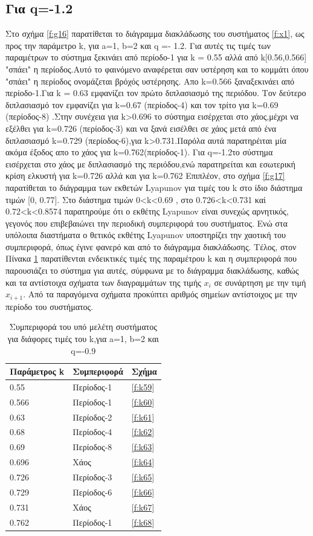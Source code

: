 \subsection{Για q=-1.2}
Στο σχήμα \ref{f:g16} παρατίθεται το διάγραμμα διακλάδωσης του συστήματος \ref{f:x1}, ως προς την παράμετρο k, για a=1, b=2 και q =- 1.2. Για αυτές τις τιμές των παραμέτρων το σύστημα ξεκινάει από περίοδο-1 για k = 0.55 αλλά από k[0.56,0.566] "σπάει" η περίοδος.Αυτό το φαινόμενο αναφέρεται σαν υστέρηση και το κομμάτι όπου "σπάει" η περίοδος ονομάζεται βρόχός υστέρησης. Απο k=0.566 ξαναξεκινάει από περίοδο-1.Για  k = 0.63 εμφανίζει τον πρώτο διπλασιασμό της περιόδου. Τον δεύτερο διπλασιασμό τον εμφανίζει για k=0.67 (περίοδος-4) και τον τρίτο για k=0.69 (περίοδος-8) .Στην συνέχεια για k>0.696 το σύστημα εισέρχεται στο χάος,μέχρι να εξέλθει  για k=0.726 (περίοδος-3) και να ξανά εισέλθει σε χάος μετά από ένα διπλασιασμό k=0.729 (περίοδος-6),για k>0.731.Παρόλα αυτά παρατηρέιται μία ακόμα έξοδος απο το χάος για k=0.762(περίοδος-1).
Για q=-1.2το σύστημα εισέρχεται στο χάος με διπλασιασμό της περιόδου,ενώ παρατηρείται και εσωτερική κρίση ελκυστή για k=0.726 αλλά και για k=0.762
Επιπλέον, στο σχήμα \ref{f:g17} παρατίθεται το διάγραμμα των εκθετών Lyapunov για τιμές του k στο ίδιο διάστημα τιμών [0, 0.77].  Στο διάστημα τιμών   0<k<0.69 , στο 0.726<k<0.731 καί 0.72<k<0.8574 παρατηρούμε ότι ο εκθέτης Lyapunov είναι συνεχώς αρνητικός, γεγονός που επιβεβαιώνει την περιοδική συμπεριφορά του συστήματος. Ενώ στα υπόλοιπα διαστήματα ο θετικός εκθέτης Lyapunov υποστηρίζει την χαοτική του συμπεριφορά, όπως έγινε φανερό και από το διάγραμμα διακλάδωσης.
Τέλος, στον Πίνακα \ref{tab:abc5} παρατίθενται ενδεικτικές τιμές της παραμέτρου k και η συμπεριφορά που παρουσιάζει το σύστημα για αυτές, σύμφωνα με το διάγραμμα διακλάδωσης, καθώς και τα αντίστοιχα σχήματα των διαγραμμάτων της τιμής \(x_i\) σε συνάρτηση με την τιμή \(x_{i+1}\). Από τα παραγόμενα σχήματα προκύπτει αριθμός σημείων αντίστοιχος με την περίοδο του συστήματος.
\begin{table}[h!]
	\centering
	\begin{tabular}{l | l | l}
		Παράμετρος k & Συμπεριφορά & Σχήμα\\
		\hline
		0.55 &  Περίοδος-1 & \ref{f:k59}\\
		0.566 &  Περίοδος-1 & \ref{f:k60}\\
		0.63& Περίοδος-2 & \ref{f:k61}\\
		0.68& Περίοδος-4 & \ref{f:k62}\\
		0.69 &  Περίοδος-8 & \ref{f:k63}\\
		0.696& Χάος & \ref{f:k64}\\
		0.726& Περίοδος-3 & \ref{f:k65}\\
		0.729& Περίοδος-6 & \ref{f:k66}\\
		0.731& Χάος & \ref{f:k67}\\
		0.762 &  Περίοδος-1 & \ref{f:k68}\\
	\end{tabular}
	\caption{ Συμπεριφορά του υπό μελέτη συστήματος για διάφορες τιμές του k,για a=1, b=2 και q=-0.9}
	\label{tab:abc5}
\end{table}

